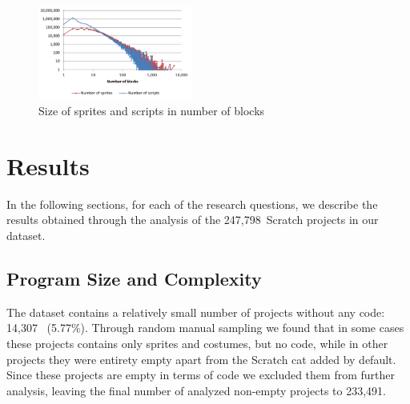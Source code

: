 \documentclass{sig-alternate}
\newcommand{\nAnalyzedPrograms}{247,798}
\newcommand{\nemptyPrograms}{14,307}
\newcommand{\nScriptPrograms}{233,491}
\begin{document}
\begin{figure}
	\centering
	\includegraphics[width=0.45\textwidth]{fig/charts/13longmethod}
	\vspace{-1em}
	\caption{Size of sprites and scripts in number of blocks}
	\label{fig:longmethod}
\end{figure}

\section{Results}
\label{sec:results}
In the following sections, for each of the research questions, we describe the results obtained through the analysis of the  \nAnalyzedPrograms~Scratch projects in our dataset.

\subsection{Program Size and Complexity}
\label{RQ1}
The dataset contains a relatively small number of projects without any code: \nemptyPrograms~ (5.77\%). Through random manual sampling we found that in some cases these projects contains only sprites and costumes, but no code, while in other projects they were entirety empty apart from the Scratch cat added by default. Since these projects are empty in terms of code we excluded them from further analysis, leaving the final number of analyzed non-empty projects to \nScriptPrograms.
\end{document}
